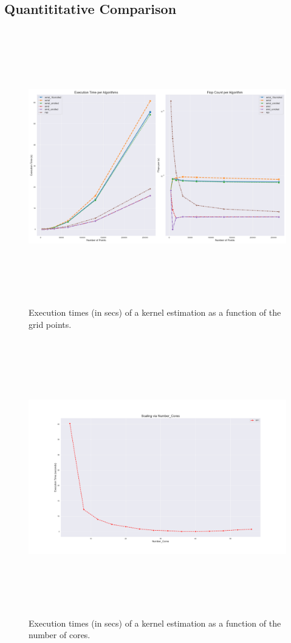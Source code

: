 \documentclass[review]{elsarticle}
\begin{document}
\subsection{Quantititative Comparison}
\begin{figure}
  \centering
  \includegraphics[width=15cm,height=12cm]{figures/executions_flops.png}
  \caption{Execution times (in secs) of a kernel estimation  as a function of the grid points. }
  \label{fig:execution_flops}
\end{figure}

\begin{figure}
  \centering
  \includegraphics[width=15cm,height=12cm]{figures/mpi_core.png}
  \caption{Execution times (in secs) of a kernel estimation  as a function of the number of cores.}
  \label{fig:mpi_core}
\end{figure}
\end{document}
